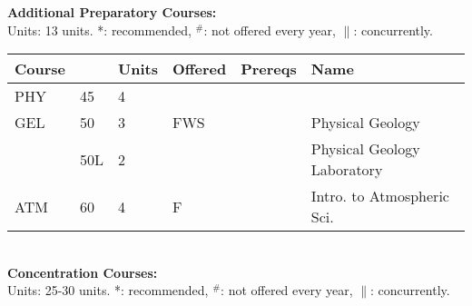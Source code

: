 \documentclass[12pt]{article}
\begin{document}
\newpage
{}
\vskip 0.25cm
\noindent
{\bf Additional Preparatory Courses:  }\\
Units: 13 units. *: recommended, $^\#$: not offered every year, $\parallel$: concurrently.\\
\begin{tabular}{|llllll|}
\hline
Course & & Units & Offered & Prereqs & Name \\
\hline
PHY & 45     & 4 &     & & \\
GEL & 50     & 3 & FWS & & Physical Geology \\
    & 50L    & 2 &     & & Physical Geology Laboratory\\
ATM & 60     & 4 & F   & & Intro. to Atmospheric Sci. \\
\hline
\end{tabular}\\
\vskip 0.25cm
\noindent
{\bf Concentration Courses:  }\\
Units:  25-30 units. *: recommended, $^\#$: not offered every year, $\parallel$: concurrently.\\
\end{document}
